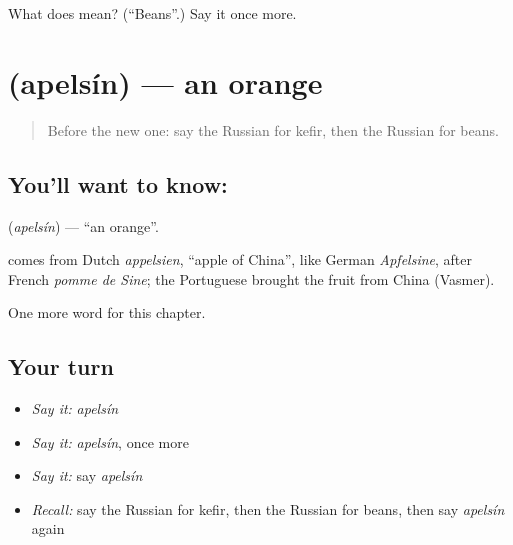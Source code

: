 \begin{tcolorbox}[breakable,colback=teal!4,colframe=teal!35!black,title={Before you move on}]
What does  mean? (\textquotedblleft{}Beans\textquotedblright{}.) Say it once more.
\end{tcolorbox}
\section[\texorpdfstring{\ru{апельсин} (apelsín)}{апельсин (apelsín)}]{ (apelsín) — an orange}

\label{lesson:RU-C223-apelsin}



\begin{quote}
Before the new one: say the Russian for kefir, then the Russian for beans.
\end{quote}

\subsection*{You'll want to know: }
\textbf{} (\emph{apelsín}) — \textquotedblleft{}an orange\textquotedblright{}.

\begin{cousinweb}
\textbf{} comes from Dutch \emph{appelsien}, \textquotedblleft{}apple of China\textquotedblright{}, like German \emph{Apfelsine}, after French \emph{pomme de Sine}; the Portuguese brought the fruit from China (Vasmer).
\end{cousinweb}

\begin{grammarlens}[title={What you've built}]
One more word for this chapter.
\end{grammarlens}

\subsection*{Your turn}
\begin{itemize}
\raggedright
  \item \emph{Say it:} \emph{apelsín}
  \item \emph{Say it:} \emph{apelsín}, once more
  \item \emph{Say it:} say \emph{apelsín}
  \item \emph{Recall:} say the Russian for kefir, then the Russian for beans, then say \emph{apelsín} again
\end{itemize}

